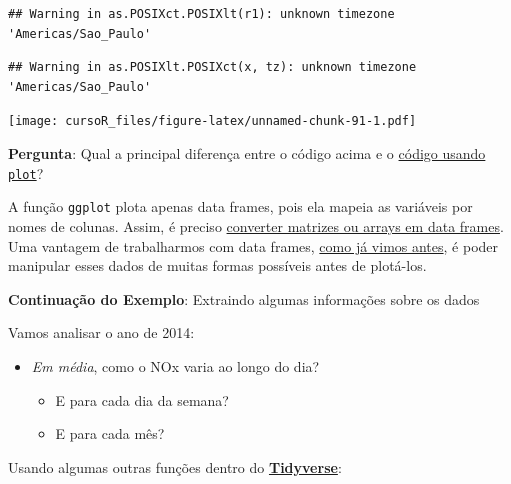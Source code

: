 \documentclass[]{book}
\providecommand{\tightlist}{%
  \setlength{\itemsep}{0pt}\setlength{\parskip}{0pt}}
\theoremstyle{definition}
\theoremstyle{definition}
\theoremstyle{definition}
\theoremstyle{remark}
\begin{document}
\begin{verbatim}
## Warning in as.POSIXct.POSIXlt(r1): unknown timezone 'Americas/Sao_Paulo'
\end{verbatim}

\begin{verbatim}
## Warning in as.POSIXlt.POSIXct(x, tz): unknown timezone 'Americas/Sao_Paulo'
\end{verbatim}

\texttt{[image: cursoR\_files/figure-latex/unnamed-chunk-91-1.pdf]}

{\textbf{Pergunta}: Qual a principal diferença entre o código acima e o
\protect\hyperlink{plot_base}{código usando \texttt{plot}}?}

A função \texttt{ggplot} plota apenas data frames, pois ela mapeia as
variáveis por nomes de colunas. Assim, é preciso
\protect\hyperlink{convert_df}{converter matrizes ou arrays em data
frames}.\\
Uma vantagem de trabalharmos com data frames,
\protect\hyperlink{processing_dfs}{como já vimos antes}, é poder
manipular esses dados de muitas formas possíveis antes de plotá-los.

\textbf{Continuação do Exemplo}: Extraindo algumas informações sobre os
dados

Vamos analisar o ano de 2014:

\begin{itemize}
\tightlist
\item
  \emph{Em média}, como o NOx varia ao longo do dia?

  \begin{itemize}
  \tightlist
  \item
    E para cada dia da semana?\\
  \item
    E para cada mês?
  \end{itemize}
\end{itemize}

Usando algumas outras funções dentro do
\protect\hyperlink{tidyverse}{\textbf{Tidyverse}}:
\end{document}
